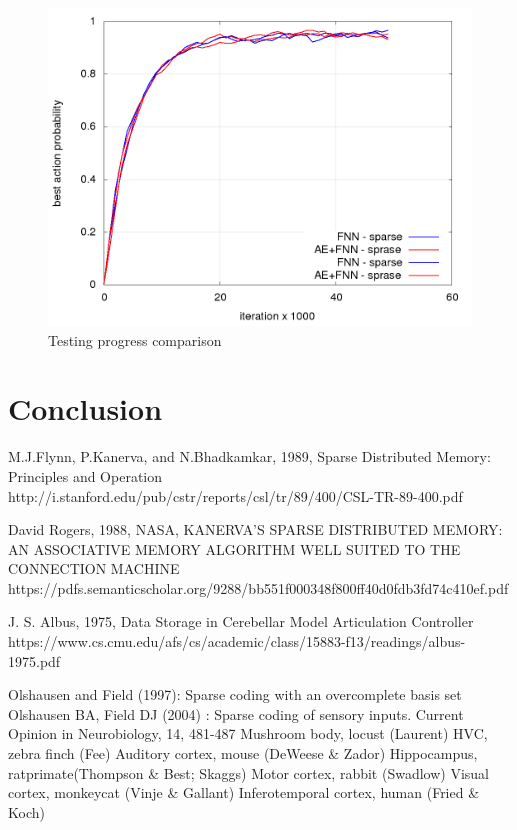 \documentclass[10pt,a4paper]{article}
\begin{document}
\begin{figure}[!h]
  \centering
  \includegraphics[scale=0.4]{../../results/rl_arcade/testing_progress.png}
  \caption{Testing progress comparison}
  \label{img:Testing progress comparison}
\end{figure}

\newpage
\section{Conclusion}

\newpage



\begin{thebibliography}{4}

 M.J.Flynn, P.Kanerva, and N.Bhadkamkar, 1989, Sparse Distributed Memory: Principles and Operation
http://i.stanford.edu/pub/cstr/reports/csl/tr/89/400/CSL-TR-89-400.pdf

 David Rogers, 1988, NASA, KANERVA’S SPARSE DISTRIBUTED MEMORY: AN ASSOCIATIVE MEMORY ALGORITHM WELL SUITED TO THE CONNECTION MACHINE
https://pdfs.semanticscholar.org/9288/bb551f000348f800ff40d0fdb3fd74c410ef.pdf

 J. S. Albus, 1975, Data Storage in Cerebellar Model Articulation Controller
https://www.cs.cmu.edu/afs/cs/academic/class/15883-f13/readings/albus-1975.pdf



 Olshausen and Field (1997): Sparse coding with an overcomplete basis set
 Olshausen BA, Field DJ (2004) : Sparse coding of sensory inputs. Current Opinion in Neurobiology, 14, 481-487
 Mushroom body, locust  (Laurent)
 HVC, zebra finch (Fee)
 Auditory cortex, mouse  (DeWeese \& Zador)
 Hippocampus, rat\/primate(Thompson \& Best; Skaggs)
 Motor cortex, rabbit  (Swadlow)
 Visual cortex, monkey\/cat  (Vinje \& Gallant)
 Inferotemporal cortex, human (Fried \& Koch)



\end{thebibliography}
\end{document}
